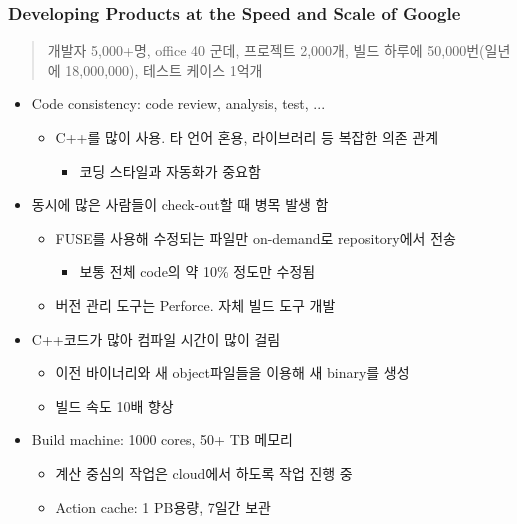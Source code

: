 \begin{frame}[allowframebreaks]
\frametitle{Developing Products at the Speed and Scale of Google}

\begin{quote}
개발자 5,000+명, office 40 군데, 프로젝트 2,000개, 빌드 하루에 50,000번(일년에 18,000,000), 테스트 케이스 1억개
\end{quote}

\begin{itemize}

\item Code consistency: code review, analysis, test, ...
    \begin{itemize}
    \item C++를 많이 사용. 타 언어 혼용, 라이브러리 등 복잡한 의존 관계
      \begin{itemize}
      \item 코딩 스타일과 자동화가 중요함
      \end{itemize}
    \end{itemize}

\item 동시에 많은 사람들이 check-out할 때 병목 발생 함
    \begin{itemize}
    \item FUSE를 사용해 수정되는 파일만 on-demand로 repository에서 전송 
         \begin{itemize}
         \item 보통 전체 code의 약  10\% 정도만 수정됨
         \end{itemize}
    \item 버전 관리 도구는 Perforce. 자체 빌드 도구 개발
    \end{itemize}
\item C++코드가 많아 컴파일 시간이 많이 걸림
    \begin{itemize}
    \item 이전 바이너리와 새 object파일들을 이용해 새 binary를 생성
    \item 빌드 속도 10배 향상
    \end{itemize}

\item Build machine: 1000 cores, 50+ TB 메모리
    \begin{itemize}
    \item 계산 중심의 작업은 cloud에서 하도록 작업 진행 중
    \item Action cache: 1 PB용량, 7일간 보관
    \end{itemize}


\end{itemize}
\end{frame}
